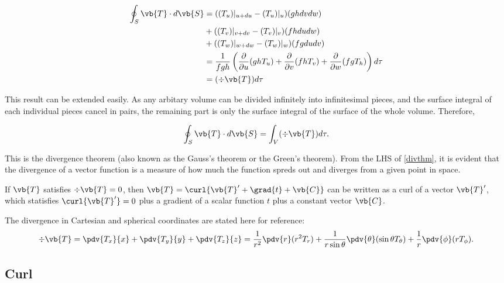 \documentclass[english,a4paper,12pt]{report}
\begin{document}
\begin{equation} \label{divpre} 
	\begin{aligned} 
    \oint_{S} \vb{T} \cdot d\vb{S} &= ((T_u)|_{u+du} - (T_u)|_{u})(ghdvdw) \\ &+ ((T_v)|_{v+dv} - (T_v)|_{v})(fhdudw) \\ &+ ((T_w)|_{w+dw} - (T_w)|_{w})(fgdudv) \\
    &= \frac{1}{fgh} \left( 
		\frac{\partial}{\partial u} (ghT_{u} ) + 
		\frac{\partial}{\partial v} (fhT_{v} )+ 
		\frac{\partial}{\partial w} (fgT_{h} ) \right) d\tau \\
	&= (\div{\vb{T}}) d\tau
    \end{aligned} 
\end{equation} 
	
This result can be extended easily. As any arbitary volume can be divided infinitely into infinitesimal pieces, and the surface integral of each individual pieces cancel in pairs, the remaining part is only the surface integral of the surface of the whole volume. Therefore,
	
\begin{equation} 
	\oint_{S} \vb{T} \cdot d\vb{S} = \int_{V}(\div{\vb{T} }) d\tau \label{divthm}.  
\end{equation}
	
This is the divergence theorem (also known as the Gauss's theorem or the Green's theorem). From the LHS of \cref{divthm}, it is evident that the divergence of a vector function is a measure of how much the function spreds out and diverges from a given point in space.


If \(\vb{T} \) satisfies \(\div{\vb{T} } = 0 \), then \(\vb{T} = \curl{\vb{T} ' + \grad{t} + \vb{C} } \) can be written as a curl of a vector \(\vb{T} '\), which statisfies \(\curl{\vb{T} '} = 0 \) plus a gradient of a scalar function \(t\) plus a constant vector \(\vb{C} \).        

The divergence in Cartesian and spherical coordinates are stated here for reference:
\begin{equation} 
	\div{\vb{T}} = \pdv{T_x}{x} + \pdv{T_y}{y} + \pdv{T_z}{z} = \frac{1}{r^2}\pdv{r}(r^2T_r) + \frac{1}{r\sin{\theta}}\pdv{\theta}(\sin{\theta}T_{\theta}) + \frac{1}{r}\pdv{\phi}(rT_{\phi}). 
\end{equation}
	
\subsection{Curl}
\end{document}

